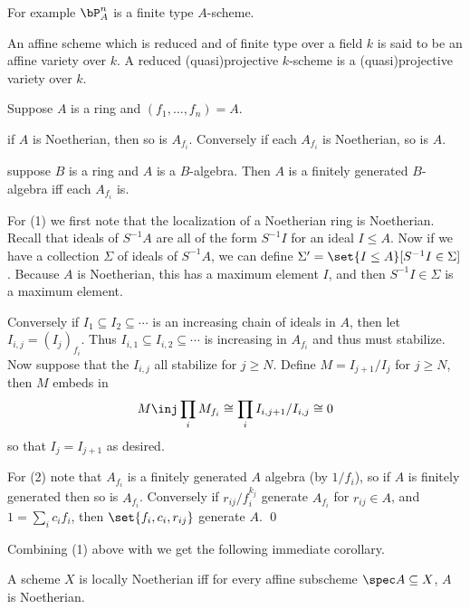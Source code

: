 For example $\bP^n_A$ is a finite type $A$-scheme.

\bdefn

    An affine scheme which is reduced and of finite type over a field $k$ is said to be an {\emphcolor affine variety} over $k$.
    A reduced (quasi)projective $k$-scheme is a {\emphcolor (quasi)projective variety} over $k$.

\edefn

\bprop

    Suppose $A$ is a ring and $(f_1,\dots,f_n)=A$.
    \benum
        \item if $A$ is Noetherian, then so is $A_{f_i}$.
        Conversely if each $A_{f_i}$ is Noetherian, so is $A$.
        \item suppose $B$ is a ring and $A$ is a $B$-algebra.
        Then $A$ is a finitely generated $B$-algebra iff each $A_{f_i}$ is.
    \eenum

\eprop

\bproof

    For (1) we first note that the localization of a Noetherian ring is Noetherian.
    Recall that ideals of $S^{-1}A$ are all of the form $S^{-1}I$ for an ideal $I\leq A$.
    Now if we have a collection $\Sigma$ of ideals of $S^{-1}A$, we can define $\Sigma'=\set{I\leq A}[S^{-1}I\in\Sigma]$.
    Because $A$ is Noetherian, this has a maximum element $I$, and then $S^{-1}I\in\Sigma$ is a maximum element.

    Conversely if $I_1\subseteq I_2\subseteq\cdots$ is an increasing chain of ideals in $A$, then let $I_{i,j}=(I_j)_{f_i}$.
    Thus $I_{i,1}\subseteq I_{i,2}\subseteq\cdots$ is increasing in $A_{f_i}$ and thus must stabilize.
    Now suppose that the $I_{i,j}$ all stabilize for $j\geq N$.
    Define $M=I_{j+1}/I_j$ for $j\geq N$, then $M$ embeds in
    $$ M \inj \prod_i M_{f_i} \cong \prod_i I_{i,j+1}/I_{i,j} \cong 0 $$
    so that $I_j=I_{j+1}$ as desired.

    For (2) note that $A_{f_i}$ is a finitely generated $A$ algebra (by $1/f_i$), so if $A$ is finitely generated then so is $A_{f_i}$.
    Conversely if $r_{ij}/f_i^{k_j}$ generate $A_{f_i}$ for $r_{ij}\in A$, and $1=\sum_ic_if_i$, then $\set{f_i,c_i,r_{ij}}$ generate $A$.
    \qed

\eproof

Combining (1) above with  we get the following immediate corollary.

\bcoro

    A scheme $X$ is locally Noetherian iff for every affine subscheme $\spec A\subseteq X$, $A$ is Noetherian.

